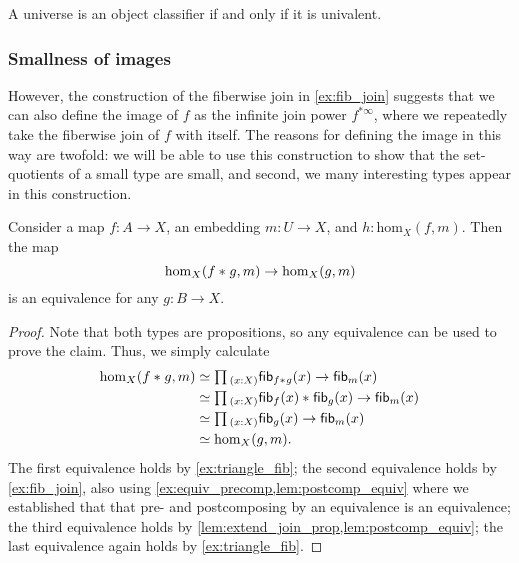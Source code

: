 \begin{cor}
  A universe is an object classifier if and only if it is univalent.
\end{cor}

\subsubsection{Smallness of images}
However, the construction of the fiberwise join in \cref{ex:fib_join} suggests that we can also define the image of $f$ as the infinite join power $f^{\ast\infty}$, where we repeatedly take the fiberwise join of $f$ with itself. The reasons for defining the image in this way are twofold: we will be able to use this construction to show that the set-quotients of a small type are small, and second, we many interesting types appear in this construction.

\begin{lem}
Consider a map $f:A\to X$, an embedding $m:U\to X$, and $h:\mathrm{hom}_X(f,m)$. Then the map
\begin{equation*}
\mathrm{hom}_X({f}\ast_{}{g},m)\to \mathrm{hom}_X(g,m)
\end{equation*}
is an equivalence for any $g:B\to X$.
\end{lem}

\begin{proof}
Note that both types are propositions, so any equivalence can be used to prove the claim. Thus, we simply calculate
\begin{align*}
\mathrm{hom}_X(\join{f}{g},m) & \eqvsym \prd{x:X}\fib{\join{f}{g}}{x}\to \fib{m}{x} \\
& \eqvsym \prd{x:X}\join{\fib{f}{x}}{\fib{g}{x}}\to\fib{m}{x} \\
& \eqvsym \prd{x:X}\fib{g}{x}\to\fib{m}{x} \\
& \eqvsym \mathrm{hom}_X(g,m).
\end{align*}
The first equivalence holds by \cref{ex:triangle_fib}; the second equivalence holds by \cref{ex:fib_join}, also using \cref{ex:equiv_precomp,lem:postcomp_equiv} where we established that that pre- and postcomposing by an equivalence is an equivalence; the third equivalence holds by \cref{lem:extend_join_prop,lem:postcomp_equiv}; the last equivalence again holds by \cref{ex:triangle_fib}.
\end{proof}

